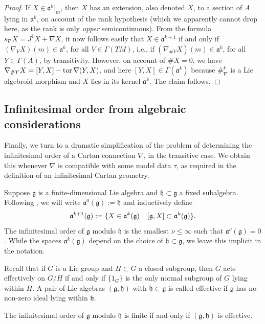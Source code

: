 \documentclass[leqno,12pt]{amsart} %
\begin{document}
\begin{proof}
  If $X \in {\mathfrak a}^k|_m$, then $X$ has an extension, also denoted $X$, to a
  section of $A$ lying in ${\mathfrak a}^k$, on account of the rank hypothesis
  (which we apparently cannot drop here, as the rank is only {\em upper}
  semicontinuous). From the formula $s_\nabla X=J^1X + \nabla X$, it now follows easily
  that $X \in {\mathfrak a}^{k+1}$ if and only if
  $(\nabla_VX)(m) \in {\mathfrak a}^k$, for all $V \in \Gamma(TM)$, i.e., if
  $(\nabla_{\#Y}X)(m) \in {\mathfrak a}^k$, for all $Y \in \Gamma(A)$, by
  transitivity.  However, on account of $\#X = 0$, we have
  $\nabla_{\#Y}X = [Y, X] - \operatorname{tor} \nabla (Y, X)$, and here
  $[Y, X] \in \Gamma({\mathfrak a}^k)$ because $\#_\nabla^k$ is a Lie algebroid
  morphism and $X$ lies in its kernel ${\mathfrak a}^k$. The claim follows.
\end{proof}

\subsection{Infinitesimal order from algebraic considerations}\label{from_algebraic} Finally, we turn to a
dramatic simplification of the problem of determining the infinitesimal order of a Cartan
connection $\nabla $, in the transitive case. We obtain this whenever $\nabla $ is
compatible with some model data $\tau $, as required in the definition of an infinitesimal
Cartan geometry.

Suppose ${\mathfrak g} $ is a finite-dimensional Lie algebra and
${\mathfrak h} \subset {\mathfrak g} $ a fixed subalgebra. Following
\cite{Abadoglu_etal_08,Guillemin_Sternberg_64,Singer_Sternberg_65}, we will write
${\mathfrak a}^0({\mathfrak g}):={\mathfrak h} $ and inductively define
$${\mathfrak a}^{k+1}({\mathfrak g}):=\{X \in {\mathfrak a}^k({\mathfrak g})\,\left\vert\right.\, [{\mathfrak g},X] \subset
{\mathfrak a}^k({\mathfrak g})\}.$$ The {\df infinitesimal order} of ${\mathfrak g}$ {\df
  modulo ${\mathfrak h}$} is the smallest $\nu\le\infty$ such that
${\mathfrak a}^\nu({\mathfrak g})=0$. While the spaces ${\mathfrak a}^k({\mathfrak g})$
depend on the choice of ${\mathfrak h} \subset {\mathfrak g} $, we leave this implicit in
the notation.

Recall that if $G $ is a Lie group and $H \subset G$ a closed subgroup, then $G$ acts
effectively on $G/H$ if and only if $\{1_G\}$ is the only normal subgroup of $G$ lying
within $H$. A pair of Lie algebras $({\mathfrak g}, {\mathfrak h})$ with
${\mathfrak h} \subset {\mathfrak g} $ is called {\df effective} if ${\mathfrak g} $ has
no non-zero ideal lying within ${\mathfrak h} $.
\begin{proposition}
  The infinitesimal order of ${\mathfrak g} $ modulo ${\mathfrak h}$ is finite if and only
  if $({\mathfrak g}, {\mathfrak h})$ is effective.
\end{proposition}
\noindent%
\end{document}
